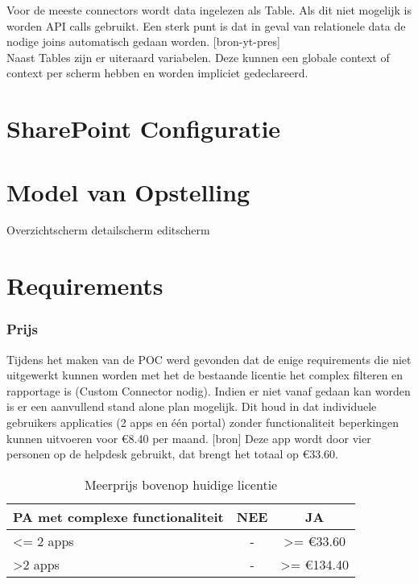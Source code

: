Voor de meeste connectors wordt data ingelezen als Table. Als dit niet mogelijk is worden API calls gebruikt. Een sterk punt is dat in geval van relationele data de nodige joins automatisch gedaan worden. [bron-yt-pres]\\
Naast Tables zijn er uiteraard variabelen. Deze kunnen een globale context of context per scherm hebben en worden impliciet gedeclareerd.

\section{SharePoint Configuratie}


\section{Model van Opstelling}


Overzichtscherm
detailscherm
editscherm

\section{Requirements}

\subsubsection{Prijs}

Tijdens het maken van de POC werd gevonden dat de enige requirements die niet uitgewerkt kunnen worden met het de bestaande licentie het complex filteren en rapportage is (Custom Connector nodig). Indien er niet vanaf gedaan kan worden is er een aanvullend stand alone plan mogelijk. Dit houd in dat individuele gebruikers applicaties (2 apps en één portal) zonder functionaliteit beperkingen kunnen uitvoeren voor \euro 8.40 per maand. [bron] Deze app wordt door vier personen op de helpdesk gebruikt, dat brengt het totaal op \euro 33.60.

\begin{table}[h!]
    \begin{tabular}{|l|c|c|}
        \hline
        \textbf{PA met complexe functionaliteit} & \textbf{NEE} & \textbf{JA}             \\ \hline
        \textless{}= 2 apps                      & -            & \textgreater{}= \euro 33.60  \\ \hline
        \textgreater 2 apps                      & -            & \textgreater{}= \euro 134.40 \\ \hline
    \end{tabular}
    \caption{Meerprijs bovenop huidige licentie}
\end{table}


